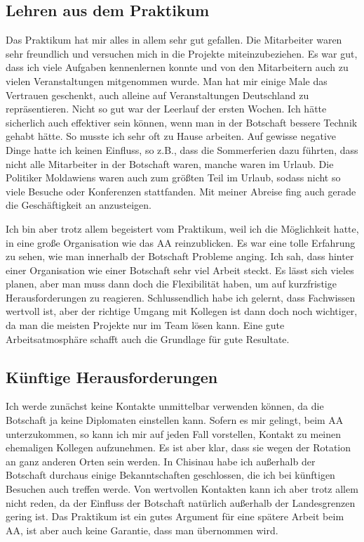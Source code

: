 \documentclass[12pt,a4paper, headsepline]{scrartcl}
\begin{document}
\subsection{Lehren aus dem Praktikum}
Das Praktikum hat mir alles in allem sehr gut gefallen. Die Mitarbeiter waren sehr freundlich und versuchen mich in die Projekte miteinzubeziehen. Es war gut, dass ich viele Aufgaben kennenlernen konnte und von den Mitarbeitern auch zu vielen Veranstaltungen mitgenommen wurde. Man hat mir einige Male das Vertrauen geschenkt, auch alleine auf Veranstaltungen Deutschland zu repräsentieren. Nicht so gut war der Leerlauf der ersten Wochen. Ich hätte sicherlich auch effektiver sein können, wenn man in der Botschaft bessere Technik gehabt hätte. So musste ich sehr oft zu Hause arbeiten. Auf gewisse negative Dinge hatte ich keinen Einfluss, so z.B., dass die Sommerferien dazu führten, dass nicht alle Mitarbeiter in der Botschaft waren, manche waren im Urlaub. Die Politiker Moldawiens waren auch zum größten Teil im Urlaub, sodass nicht so viele Besuche oder Konferenzen stattfanden. Mit meiner Abreise fing auch gerade die Geschäftigkeit an anzusteigen.

Ich bin aber trotz allem begeistert vom Praktikum, weil ich die Möglichkeit hatte, in eine große Organisation wie das AA reinzublicken. Es war eine tolle Erfahrung zu sehen, wie man innerhalb der Botschaft Probleme anging. Ich sah, dass hinter einer Organisation wie einer Botschaft sehr viel Arbeit steckt. Es lässt sich vieles planen, aber man muss dann doch die Flexibilität haben, um auf kurzfristige Herausforderungen zu reagieren. Schlussendlich habe ich gelernt, dass Fachwissen wertvoll ist, aber der richtige Umgang mit Kollegen ist dann doch noch wichtiger, da man die meisten Projekte nur im Team lösen kann. Eine gute Arbeitsatmosphäre schafft auch die Grundlage für gute Resultate.

\subsection{Künftige Herausforderungen}
Ich werde zunächst keine Kontakte unmittelbar verwenden können, da die Botschaft ja keine Diplomaten einstellen kann. Sofern es mir gelingt, beim AA unterzukommen, so kann ich mir auf jeden Fall vorstellen, Kontakt zu meinen ehemaligen Kollegen aufzunehmen. Es ist aber klar, dass sie wegen der Rotation an ganz anderen Orten sein werden. In Chisinau habe ich außerhalb der Botschaft durchaus einige Bekanntschaften geschlossen, die ich bei künftigen Besuchen auch treffen werde. Von wertvollen Kontakten kann ich aber trotz allem nicht reden, da der Einfluss der Botschaft natürlich außerhalb der Landesgrenzen gering ist. Das Praktikum ist ein gutes Argument für eine spätere Arbeit beim AA, ist aber auch keine Garantie, dass man übernommen wird.
\end{document}
